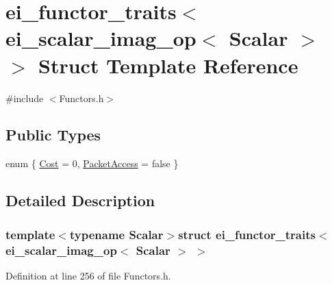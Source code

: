 \hypertarget{structei__functor__traits_3_01ei__scalar__imag__op_3_01_scalar_01_4_01_4}{\section{ei\-\_\-functor\-\_\-traits$<$ ei\-\_\-scalar\-\_\-imag\-\_\-op$<$ Scalar $>$ $>$ Struct Template Reference}
\label{structei__functor__traits_3_01ei__scalar__imag__op_3_01_scalar_01_4_01_4}
}


{\ttfamily \#include $<$Functors.\-h$>$}

\subsection*{Public Types}
\begin{DoxyCompactItemize}
\item 
enum \{ \hyperlink{structei__functor__traits_3_01ei__scalar__imag__op_3_01_scalar_01_4_01_4_a313713a0fa383f93d5c13e06e85b0dc0aa1b2c78b5d7b808da6ef580019593f90}{Cost} = 0, 
\hyperlink{structei__functor__traits_3_01ei__scalar__imag__op_3_01_scalar_01_4_01_4_a313713a0fa383f93d5c13e06e85b0dc0a1df4980a01c218a634266907bc56190f}{Packet\-Access} = false
 \}
\end{DoxyCompactItemize}


\subsection{Detailed Description}
\subsubsection*{template$<$typename Scalar$>$struct ei\-\_\-functor\-\_\-traits$<$ ei\-\_\-scalar\-\_\-imag\-\_\-op$<$ Scalar $>$ $>$}



Definition at line 256 of file Functors.\-h.



